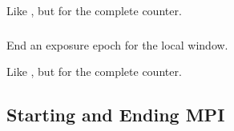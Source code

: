 \documentclass{article}
\begin{document}
Like , but for the complete counter.

\subsubsection{}
End an exposure epoch for the local window.

Like , but for the complete counter.

\subsection{Starting and Ending MPI}

\subsubsection{}
\begin{adi3}
\end{adi3}
\end{document}

